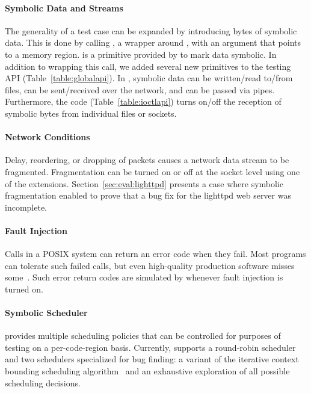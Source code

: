 \paragraph{Symbolic Data and Streams} The generality of a test case can be expanded by introducing bytes of symbolic data. This is done by calling , a wrapper around , with an argument that points to a memory region.  is a primitive provided by \klee to mark data symbolic.  In addition to wrapping this call, we added several new primitives to the testing API (Table~\ref{table:globalapi}). In \cnine, symbolic data can be written/read to/from files, can be sent/received over the network, and can be passed via pipes. Furthermore, the   code (Table~\ref{table:ioctlapi}) turns on/off the reception of symbolic bytes from individual files or sockets.

\paragraph{Network Conditions} Delay, reordering, or dropping of packets causes a network data stream to be fragmented.  Fragmentation can be turned on or off at the socket level using one of the \cnine {} extensions.  Section~\ref{sec:eval:lighttpd} presents a case where symbolic fragmentation enabled \cnine to prove that a bug fix for the lighttpd web server was incomplete. 

\paragraph{Fault Injection} Calls in a POSIX system can return an error code when they fail. Most programs can tolerate such failed calls, but even high-quality production software misses some~\cite{lfi}. Such error return codes are simulated by \cnine whenever fault injection is turned on. 

\paragraph{Symbolic Scheduler} \cnine provides multiple scheduling policies that can be controlled for purposes of testing on a per-code-region basis.  Currently, \cnine supports a round-robin scheduler and two schedulers specialized for bug finding: a variant of the iterative context bounding scheduling algorithm~\cite{chess} and an exhaustive exploration of all possible scheduling decisions.  


